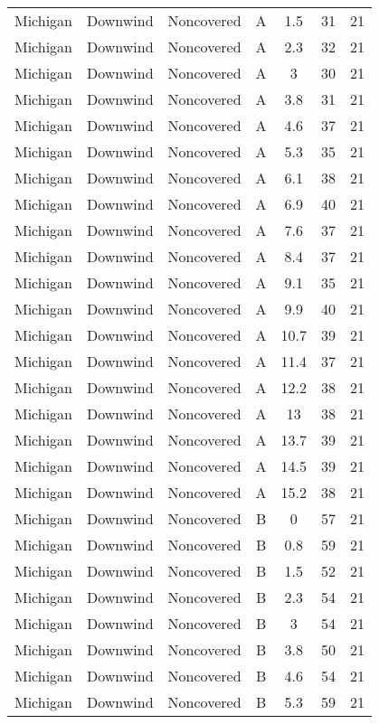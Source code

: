 \documentclass{article}
\begin{document}
\begin{longtable}[H]{ccccccc}
Michigan & Downwind & Noncovered & A & 1.5  & 31 & 21 \\
Michigan & Downwind & Noncovered & A & 2.3  & 32 & 21 \\
Michigan & Downwind & Noncovered & A & 3    & 30 & 21 \\
Michigan & Downwind & Noncovered & A & 3.8  & 31 & 21 \\
Michigan & Downwind & Noncovered & A & 4.6  & 37 & 21 \\
Michigan & Downwind & Noncovered & A & 5.3  & 35 & 21 \\
Michigan & Downwind & Noncovered & A & 6.1  & 38 & 21 \\
Michigan & Downwind & Noncovered & A & 6.9  & 40 & 21 \\
Michigan & Downwind & Noncovered & A & 7.6  & 37 & 21 \\
Michigan & Downwind & Noncovered & A & 8.4  & 37 & 21 \\
Michigan & Downwind & Noncovered & A & 9.1  & 35 & 21 \\
Michigan & Downwind & Noncovered & A & 9.9  & 40 & 21 \\
Michigan & Downwind & Noncovered & A & 10.7 & 39 & 21 \\
Michigan & Downwind & Noncovered & A & 11.4 & 37 & 21 \\
Michigan & Downwind & Noncovered & A & 12.2 & 38 & 21 \\
Michigan & Downwind & Noncovered & A & 13   & 38 & 21 \\
Michigan & Downwind & Noncovered & A & 13.7 & 39 & 21 \\
Michigan & Downwind & Noncovered & A & 14.5 & 39 & 21 \\
Michigan & Downwind & Noncovered & A & 15.2 & 38 & 21 \\
Michigan & Downwind & Noncovered & B & 0    & 57 & 21 \\
Michigan & Downwind & Noncovered & B & 0.8  & 59 & 21 \\
Michigan & Downwind & Noncovered & B & 1.5  & 52 & 21 \\
Michigan & Downwind & Noncovered & B & 2.3  & 54 & 21 \\
Michigan & Downwind & Noncovered & B & 3    & 54 & 21 \\
Michigan & Downwind & Noncovered & B & 3.8  & 50 & 21 \\
Michigan & Downwind & Noncovered & B & 4.6  & 54 & 21 \\
Michigan & Downwind & Noncovered & B & 5.3  & 59 & 21 \\

\end{longtable}
\end{document}
